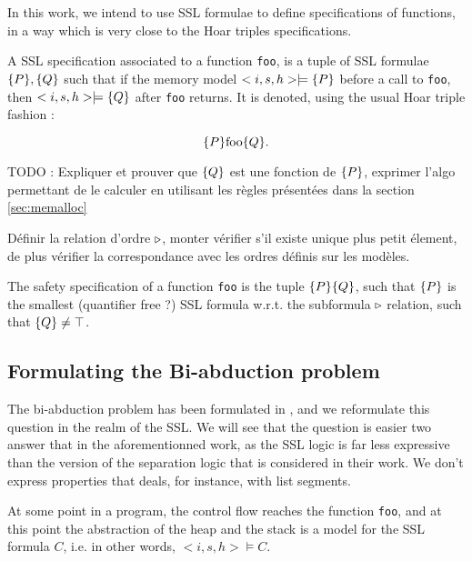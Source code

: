 
In this work, we intend to use SSL formulae to define specifications of functions,
in a way which is very close to the Hoar triples specifications.


\begin{definition}
A SSL specification associated to a function \lstinline!foo!, is a tuple
of SSL formulae $\lbrace P \rbrace, \lbrace Q \rbrace$ such that if the memory model $<i,s,h>\models \lbrace P \rbrace$
before a call to \lstinline!foo!, then $<i,s,h>\models \lbrace Q \rbrace$ after \lstinline!foo!
returns.
It is denoted, using the usual Hoar triple fashion :

$$
\Pre \mbox{\lstinline!foo!} \Post.
$$
\end{definition}

TODO :
Expliquer et prouver que $\lbrace Q \rbrace$ est une fonction de $\lbrace P \rbrace$, exprimer
l'algo permettant de le calculer en utilisant les règles présentées
dans la section \ref{sec:memalloc}

Définir la relation d'ordre $\triangleright$, monter vérifier s'il existe unique
plus petit élement, de plus vérifier la correspondance avec les ordres
définis sur les modèles.

\begin{definition}
The safety specification of a function \lstinline!foo! is the tuple
$\lbrace P \rbrace \lbrace Q \rbrace$, such that $\lbrace P \rbrace$ is the smallest (quantifier free ?) SSL 
formula w.r.t. the subformula $\triangleright$ relation, such that $\lbrace Q \rbrace\neq \top$. 
\end{definition}

\subsection{ Formulating the Bi-abduction problem}
The bi-abduction problem has been formulated in \cite{BiAbduction09}, and we reformulate this question in the realm of the SSL. We will see that the question is
easier two answer that in the aforementionned work, as the SSL logic is far
less expressive than the version of the separation logic that is considered
in their work. We don't express properties that deals, for instance, with list segments.

At some point in a program, the control flow reaches the function \lstinline!foo!,
and at this point the abstraction of the heap and the stack is a model
for the SSL formula $C$, i.e. in other words, $<i,s,h>\models C$.

